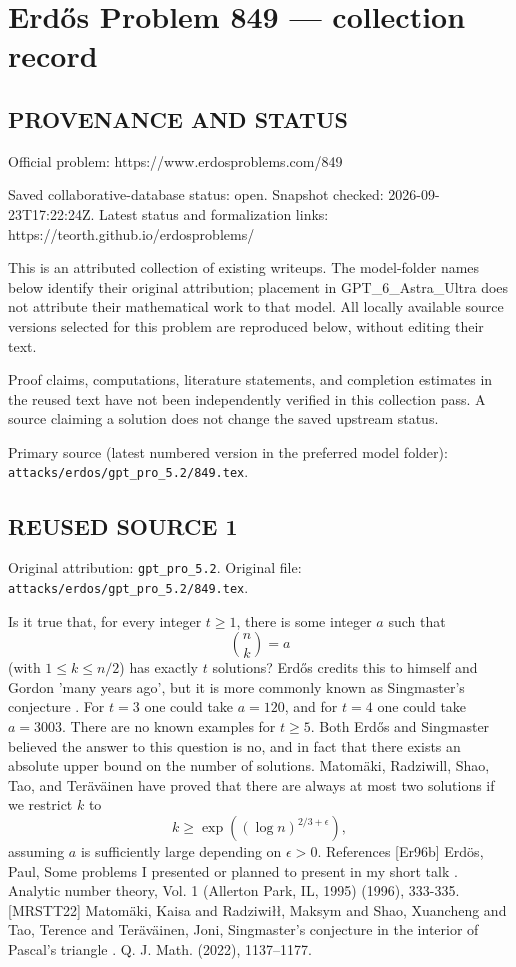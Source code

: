 \section*{Erd\H{o}s Problem 849 --- collection record}

\subsection*{PROVENANCE AND STATUS}
Official problem: https://www.erdosproblems.com/849

Saved collaborative-database status: open.
Snapshot checked: 2026-09-23T17:22:24Z.
Latest status and formalization links: https://teorth.github.io/erdosproblems/

This is an attributed collection of existing writeups. The model-folder names below identify their original attribution; placement in GPT\_6\_Astra\_Ultra does not attribute their mathematical work to that model. All locally available source versions selected for this problem are reproduced below, without editing their text.

Proof claims, computations, literature statements, and completion estimates in the reused text have not been independently verified in this collection pass. A source claiming a solution does not change the saved upstream status.

Primary source (latest numbered version in the preferred model folder): \texttt{attacks/erdos/gpt\_pro\_5.2/849.tex}.

\subsection*{REUSED SOURCE 1}
Original attribution: \texttt{gpt\_pro\_5.2}.
Original file: \texttt{attacks/erdos/gpt\_pro\_5.2/849.tex}.


Is it true that, for every integer $t\geq 1$, there is some integer $a$ such that\[\binom{n}{k}=a\](with $1\leq k\leq n/2$) has exactly $t$ solutions? Erd\H{o}s \cite{Er96b} credits this to himself and Gordon 'many years ago', but it is more commonly known as Singmaster's conjecture . For $t=3$ one could take $a=120$, and for $t=4$ one could take $a=3003$. There are no known examples for $t\geq 5$. Both Erd\H{o}s and Singmaster believed the answer to this question is no, and in fact that there exists an absolute upper bound on the number of solutions. Matom\"{a}ki, Radziwill, Shao, Tao, and Ter\"{a}v\"{a}inen \cite{MRSTT22} have proved that there are always at most two solutions if we restrict $k$ to\[k\geq \exp((\log n)^{2/3+\epsilon}),\]assuming $a$ is sufficiently large depending on $\epsilon>0$. References [Er96b] Erd\"{o}s, Paul, Some problems I presented or planned to present in my short talk . Analytic number theory, Vol. 1 (Allerton Park, IL, 1995) (1996), 333-335. [MRSTT22] Matom\"{a}ki, Kaisa and Radziwi\l\l, Maksym and Shao, Xuancheng and Tao, Terence and Ter\"{a}v\"{a}inen, Joni, Singmaster's conjecture in the interior of {P}ascal's triangle . Q. J. Math. (2022), 1137--1177.

